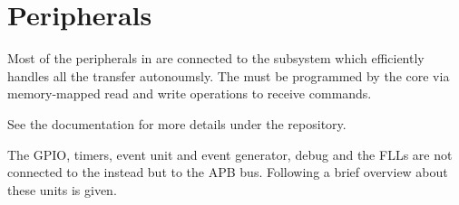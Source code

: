 \chapter{Peripherals}

Most of the peripherals in \pulpissimo are connected to the \udma subsystem which
efficiently handles all the transfer autonoumsly.
The \udma must be programmed by the core via memory-mapped read and write operations to receive commands.

See the \udma documentation for more details under the \udma repository.

The GPIO, timers, event unit and event generator, debug and the FLLs are not connected to the \udma instead but to the APB bus.
Following a brief overview about these units is given.

\clearpage

\clearpage

\clearpage

%
%
\clearpage

%
%
\clearpage

